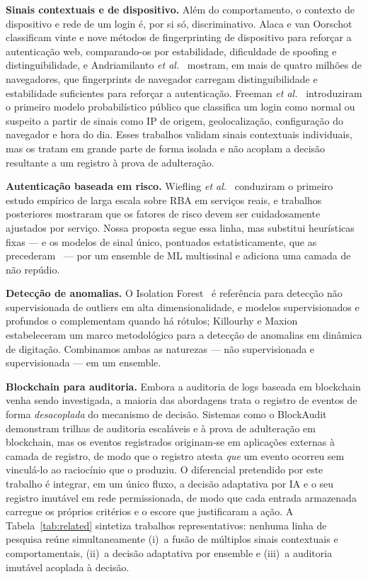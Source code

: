 \documentclass[conference]{IEEEtran}
\begin{document}
\textbf{Sinais contextuais e de dispositivo.} Além do comportamento, o
contexto de dispositivo e rede de um login é, por si só, discriminativo.
Alaca e van Oorschot~\cite{alaca2016} classificam vinte e nove métodos de
fingerprinting de dispositivo para reforçar a autenticação web,
comparando-os por estabilidade, dificuldade de spoofing e
distinguibilidade, e Andriamilanto \emph{et al.}~\cite{andriamilanto2021}
mostram, em mais de quatro milhões de navegadores, que fingerprints de
navegador carregam distinguibilidade e estabilidade suficientes para
reforçar a autenticação. Freeman \emph{et al.}~\cite{freeman2016}
introduziram o primeiro modelo probabilístico público que classifica um
login como normal ou suspeito a partir de sinais como IP de origem,
geolocalização, configuração do navegador e hora do dia. Esses trabalhos
validam sinais contextuais individuais, mas os tratam em grande parte de
forma isolada e não acoplam a decisão resultante a um registro à prova de
adulteração.

\textbf{Autenticação baseada em risco.} Wiefling \emph{et
al.}~\cite{wiefling2019} conduziram o primeiro estudo empírico de larga
escala sobre RBA em serviços reais, e trabalhos posteriores
\cite{wiefling2023} mostraram que os fatores de risco devem ser
cuidadosamente ajustados por serviço. Nossa proposta segue essa linha,
mas substitui heurísticas fixas --- e os modelos de sinal único,
pontuados estatisticamente, que as precederam~\cite{freeman2016} --- por
um ensemble de ML multissinal e adiciona uma camada de não repúdio.

\textbf{Detecção de anomalias.} O Isolation Forest~\cite{liu2008} é
referência para detecção não supervisionada de outliers em alta
dimensionalidade, e modelos supervisionados e profundos
\cite{goodfellow2016} o complementam quando há rótulos; Killourhy e
Maxion~\cite{killourhy2009} estabeleceram um marco metodológico para a
detecção de anomalias em dinâmica de digitação. Combinamos ambas as
naturezas --- não supervisionada e supervisionada --- em um ensemble.

\textbf{Blockchain para auditoria.} Embora a auditoria de logs baseada em
blockchain venha sendo investigada, a maioria das abordagens trata o
registro de eventos de forma \emph{desacoplada} do mecanismo de decisão.
Sistemas como o BlockAudit~\cite{blockaudit} demonstram trilhas de
auditoria escaláveis e à prova de adulteração em blockchain, mas os
eventos registrados originam-se em aplicações externas à camada de
registro, de modo que o registro atesta \emph{que} um evento ocorreu sem
vinculá-lo ao raciocínio que o produziu. O diferencial pretendido por este
trabalho é integrar, em um único fluxo, a decisão adaptativa por IA e o seu registro
imutável em rede permissionada, de modo que cada entrada armazenada
carregue os próprios critérios e o escore que justificaram a ação. A
Tabela~\ref{tab:related} sintetiza trabalhos representativos: nenhuma
linha de pesquisa reúne simultaneamente (i)~a fusão de múltiplos sinais
contextuais e comportamentais, (ii)~a decisão adaptativa por ensemble e
(iii)~a auditoria imutável acoplada à decisão.
\end{document}
